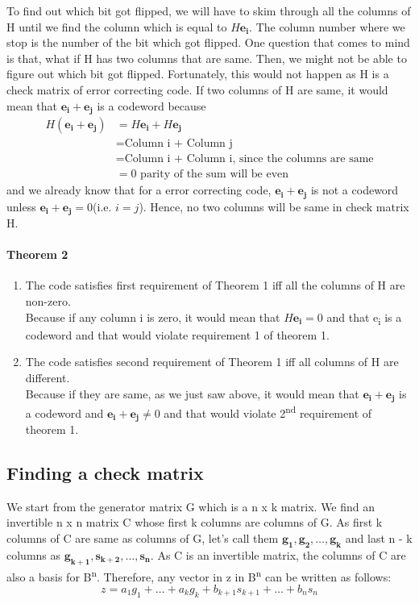 \documentclass[11pt,a4paper]{article}
\begin{document}
To find out which bit got flipped, we will have to skim through all the columns of H until we find the column which is equal to $H\mathbf{e_i}$. The column number where we stop is the number of the bit which got flipped. One question that comes to mind is that, what if H has two columns that are same. Then, we might not be able to figure out which bit got flipped. Fortunately, this would not happen as H is a check matrix of error correcting code. If two columns of H are same, it would mean that $\mathbf{e_i} + \mathbf{e_j}$ is a codeword because
$$
\begin{aligned}
    H(\mathbf{e_i} + \mathbf{e_j}) &= H\mathbf{e_i} + H\mathbf{e_j}\\
    &= \text{Column i + Column j}\\
    &= \text{Column i + Column i} \text{, since the columns are same} \\ 
    &= 0 \text{ parity of the sum will be even}
\end{aligned}
$$
and we already know that for a error correcting code, $\mathbf{e_i}+ \mathbf{e_j}$ is not a codeword unless $\mathbf{e_i} + \mathbf{e_j} = 0$(i.e. $i = j$). Hence, no two columns will be same in check matrix H. 

\paragraph{Theorem 2}

\begin{enumerate}
    \item The code satisfies first requirement of Theorem 1 iff all the columns of H are non-zero.\\ Because if any column i is zero, it would mean that $H\mathbf{e_i} = 0$ and that e\textsubscript{i} is a codeword and that would violate requirement 1 of theorem 1.
    
    \item The code satisfies second requirement of Theorem 1 iff all columns of H are different.\\ Because if they are same, as we just saw above, it would mean that $\mathbf{e_i}+ \mathbf{e_j}$ is a codeword and $\mathbf{e_i}+ \mathbf{e_j} \ne 0$ and that would violate 2\textsuperscript{nd} requirement of theorem 1.
\end{enumerate}

\subsection{Finding a check matrix}
We start from the generator matrix G which is a n x k matrix. We find an invertible n x n matrix C whose first k columns are columns of G. As first k columns of C are same as columns of G, let's call them $\mathbf{g_1}, \mathbf{g_2}, \dots, \mathbf{g_k}$ and last n - k columns as $\mathbf{g_{k+1}}, \mathbf{s_{k+2}}, \dots, \mathbf{s_{n}}$. As C is an invertible matrix, the columns of C are also a basis for B\textsuperscript{n}. Therefore, any vector in z in B\textsuperscript{n} can be written as follows:
$$z = a_1g_1 + \dots + a_kg_k + b_{k+1}s_{k+1} + \dots + b_ns_n $$
\end{document}
